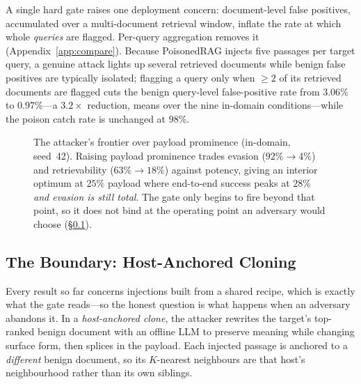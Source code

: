 \documentclass[10pt,journal,compsoc]{IEEEtran}
\begin{document}
A single hard gate raises one deployment concern: document-level false positives,
accumulated over a multi-document retrieval window, inflate the rate at which whole
\emph{queries} are flagged. Per-query aggregation removes it (Appendix~\ref{app:compare}).
Because PoisonedRAG injects five passages per target query, a genuine
attack lights up several retrieved documents while benign false positives are
typically isolated; flagging a query only when $\geq\!2$ of its retrieved documents
are flagged cuts the benign query-level false-positive rate from $3.06\%$ to
$0.97\%$---a $3.2\times$ reduction, means over the nine in-domain conditions---while the
poison catch rate is unchanged at $98\%$.

\begin{figure}[t]
\centering
{}
\caption{The attacker's frontier over payload prominence (in-domain, seed~42). Raising payload
prominence trades evasion ($92\%\!\to\!4\%$) and retrievability ($63\%\!\to\!18\%$) against
potency, giving an interior optimum at $25\%$ payload where end-to-end success peaks at $28\%$
\emph{and evasion is still total}. The gate only begins to fire beyond that point, so it does
not bind at the operating point an adversary would choose (\S\ref{subsec:boundary}).}
\label{fig:frontier}
\end{figure}

\subsection{The Boundary: Host-Anchored Cloning}
\label{subsec:boundary}
Every result so far concerns injections built from a shared recipe, which is exactly what the
gate reads---so the honest question is what happens when an adversary abandons it. In a
\emph{host-anchored clone}, the attacker rewrites the target's top-ranked benign document with an
offline LLM to preserve meaning while changing surface form, then splices in the payload. Each
injected passage is anchored to a \emph{different} benign document, so its $K$-nearest
neighbours are that host's neighbourhood rather than its own siblings.
\end{document}
